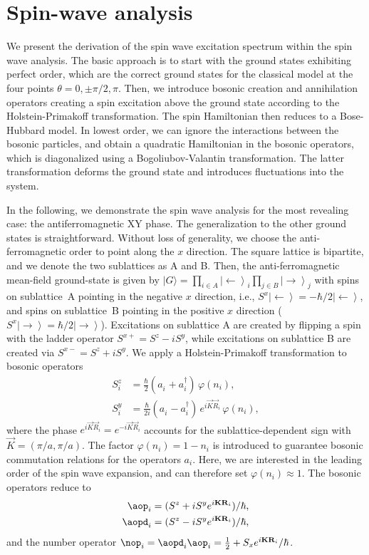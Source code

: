 \chapter{Spin-wave analysis}
\label{ap:spinwave_analysis}

We present the derivation of the spin wave excitation spectrum
within the spin wave analysis. The basic approach is to start with the ground
states exhibiting perfect order, which are the correct ground states for the classical
model at the four points $\theta = 0,\pm \pi/2, \pi$.  Then, we introduce bosonic
creation and annihilation operators creating a spin excitation above the ground
state according to the Holstein-Primakoff transformation. The spin Hamiltonian
then reduces to a Bose-Hubbard model. In lowest order, we can ignore the
interactions between the bosonic particles, and obtain a quadratic Hamiltonian
in the bosonic operators, which is diagonalized using a
Bogoliubov-Valantin transformation.  The latter transformation deforms the
ground state and introduces fluctuations into the system.

In the following, we demonstrate the spin wave analysis for the most revealing case: the antiferromagnetic XY phase.
The generalization to the other ground states is straightforward.  Without loss of generality, we choose the anti-ferromagnetic order
to point along the  $x$ direction. The square lattice is bipartite, and we denote the two sublattices as A and B. Then, the anti-ferromagnetic
 mean-field ground-state is given by   $|G\rangle = \prod_{i\in A} \left|\leftarrow\right\rangle_{i} \prod_{j\in B} \left|\rightarrow\right\rangle_{j}$
 with spins on sublattice~A pointing in the negative $x$ direction, i.e., $S^x \left|\leftarrow\right\rangle = -\hbar/2 \left|\leftarrow\right\rangle$,
 and spins on sublattice~B pointing in the positive $x$ direction ($S^x \left|\rightarrow\right\rangle = \hbar/2 \left|\rightarrow\right\rangle$).
 Excitations on sublattice A are created by flipping a spin with the ladder operator $S^{x+} = S^z-i S^y$,
 while excitations on sublattice B are created via $S^{x-} = S^z+i S^y$.
 We apply a Holstein-Primakoff transformation to bosonic operators
\begin{align} \label{transHolstein}
    S^z_i &= \frac{\hbar}{2} (a^{\phantom\dag}_i + a^{\dag}_i) \,\varphi(n_i),\\
    S^y_i &= \frac{\hbar}{2i} (a^{\phantom\dag}_i - a^{\dag}_i)\, e^{i {\vec K} {\vec R_i}} \,\varphi(n_i),
\end{align}
where the phase $e^{i {\vec K}{\vec R_i}}=e^{-i {\vec K}{\vec R_i}}$ accounts for the sublattice-dependent sign with ${\vec K} = (\pi/a, \pi/a)$. The factor $\varphi(n_i)=1-n_i$ is introduced to guarantee bosonic commutation relations for the operators $a_i$.  Here, we are interested in the leading order of the spin wave expansion, and can therefore set
 $\varphi(n_i) \approx 1$. The bosonic operators reduce to
%
\begin{align}
    \aop_i &= (S^z +i S^y e^{i {\vec K} {\vec R_i}} )/\hbar,\\
    \aopd_i &= (S^z -i S^y e^{i {\vec K} {\vec R_i}})/\hbar,
\end{align}
%
and the number operator $\nop_i = \aopd_i \aop_i = \frac{1}{2} + S_x e^{i {\vec K}{\vec R_i}}/\hbar$.



